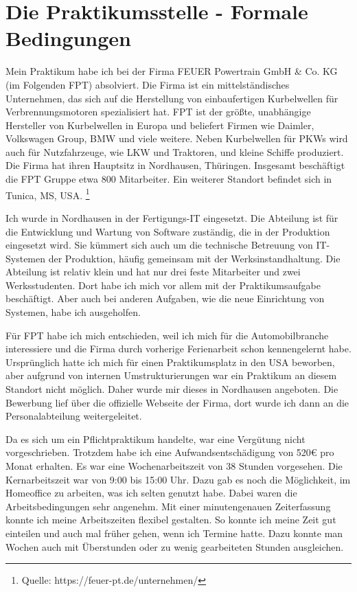 \documentclass{Vorlage}
\begin{document}
\section{Die Praktikumsstelle - Formale Bedingungen}

Mein Praktikum habe ich bei der Firma FEUER Powertrain GmbH \& Co. KG (im Folgenden FPT)
absolviert. Die Firma ist ein mittelständisches Unternehmen, das sich auf die 
Herstellung von einbaufertigen Kurbelwellen für Verbrennungsmotoren 
spezialisiert hat. FPT ist
der größte, unabhängige Hersteller von Kurbelwellen in Europa und beliefert Firmen 
wie Daimler, Volkswagen Group, BMW und viele weitere. Neben Kurbelwellen für PKWs
wird auch für Nutzfahrzeuge, wie LKW und Traktoren, und kleine Schiffe produziert.
Die Firma hat ihren Hauptsitz in Nordhausen, Thüringen. Insgesamt beschäftigt die
FPT Gruppe etwa 800 Mitarbeiter. Ein weiterer Standort befindet sich in Tunica,
MS, USA. \footnote{Quelle: https://feuer-pt.de/unternehmen/}

Ich wurde in Nordhausen in der Fertigungs-IT eingesetzt. Die Abteilung ist für die
Entwicklung und Wartung von Software zuständig, die in der Produktion eingesetzt wird.
Sie kümmert sich auch um die technische Betreuung von IT-Systemen der Produktion,
häufig gemeinsam mit der Werksinstandhaltung. Die Abteilung ist relativ klein und hat nur
drei feste Mitarbeiter und zwei Werksstudenten. Dort habe ich mich vor allem mit der 
Praktikumsaufgabe beschäftigt. Aber auch bei anderen Aufgaben, wie die neue Einrichtung von 
Systemen, habe ich ausgeholfen. 

Für FPT habe ich mich entschieden, weil ich mich für die Automobilbranche interessiere und die Firma 
durch vorherige Ferienarbeit schon kennengelernt habe. Ursprünglich hatte ich mich für einen Praktikumsplatz
in den USA beworben, aber aufgrund von internen Umstrukturierungen war ein Praktikum an diesem Standort nicht
möglich. Daher wurde mir dieses in Nordhausen angeboten. Die Bewerbung lief über die 
offizielle Webseite der Firma, dort wurde ich dann an die Personalabteilung weitergeleitet.

Da es sich um ein Pflichtpraktikum handelte, war eine Vergütung nicht vorgeschrieben. 
Trotzdem habe ich eine Aufwandsentschädigung von 520€ pro Monat erhalten. 
Es war eine Wochenarbeitszeit von 38 Stunden vorgesehen.
Die Kernarbeitszeit war von 9:00 bis 15:00 Uhr. 
Dazu gab es noch die Möglichkeit, im Homeoffice zu arbeiten, was ich selten genutzt habe.
Dabei waren die Arbeitsbedingungen sehr angenehm. Mit einer minutengenauen Zeiterfassung
konnte ich meine Arbeitszeiten flexibel gestalten. So konnte ich meine Zeit gut einteilen
und auch mal früher gehen, wenn ich Termine hatte. Dazu konnte man Wochen auch mit 
Überstunden oder zu wenig gearbeiteten Stunden ausgleichen.
\end{document}
